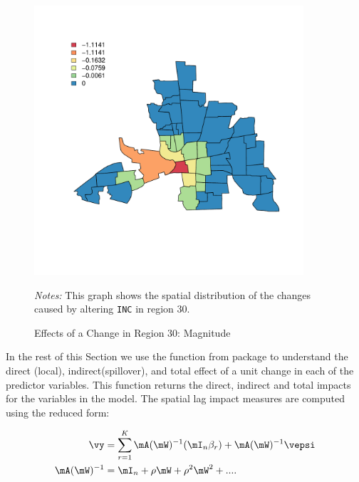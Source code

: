 \documentclass[english,12pt]{book}\usepackage[]{graphicx}\usepackage[]{xcolor}
\newenvironment{knitrout}{}{} %
\begin{document}
\begin{figure}[ht]
  \caption{Effects of a Change in Region 30: Magnitude}
    \label{fig:predicted-effect2}
        \centering 
	\begin{minipage}{.9\linewidth}
\begin{knitrout}
\color{fgcolor}

{\centering \includegraphics[width=10cm,height=10cm]{figure/predicted-effect2-1} 

}


\end{knitrout}
\footnotesize
		\emph{Notes:} This graph shows the spatial distribution of the changes caused by altering \texttt{INC} in region 30.
	\end{minipage}
\end{figure}


In the rest of this Section we use the  function from  package to understand the direct (local), indirect(spillover), and total effect of a unit change in each of the predictor variables. This function returns the direct, indirect and total impacts for the variables in the model. The spatial lag impact measures are computed using the reduced form:

\begin{equation}
  \begin{aligned}
    \vy & = \sum_{r = 1}^K \mA(\mW)^{-1}(\mI_n\beta_r) + \mA(\mW)^{-1}\vepsi \\
     \mA(\mW)^{-1} & = \mI_n + \rho\mW + \rho^2\mW^2 +....
  \end{aligned}
\end{equation}
\end{document}
